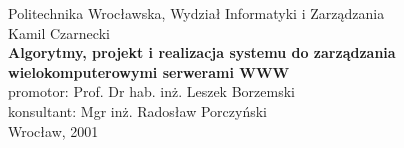 \documentclass[a4paper,polish,titlepage,12pt]{report}
\begin{document}
\begin{titlepage}
\begin{center}
{\small\sc Politechnika Wrocławska, Wydział Informatyki i Zarządzania}\\
\vspace{2.5in}
{\Large Kamil Czarnecki}\\
\vspace{10mm}
{\Huge\bf Algorytmy, projekt i realizacja systemu do zarządzania wielokomputerowymi serwerami WWW}\\
\vspace{1in}
{\large promotor: Prof. Dr hab. inż. Leszek Borzemski}\\
{\large konsultant: Mgr inż. Radosław Porczyński}\\
\vspace{2in}
{\sf Wrocław, 2001}
\end{center}
\end{titlepage}



\tableofcontents










{\footnotesize\listoffigures}
\end{document}
